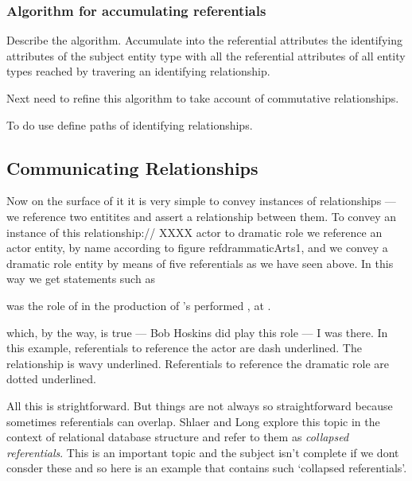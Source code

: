 \subsubsection{Algorithm for accumulating referentials}

Describe the algorithm.
Accumulate into the referential attributes the identifying attributes of the subject entity type
with all the referential attributes of all entity types reached by travering an identifying relationship.

Next need to refine this algorithm to take account of commutative relationships. 

To do use define paths of identifying relationships.

\subsection{Communicating Relationships}

\mynote 
Now on the surface of it it is very simple
to convey instances of relationships --- we reference two entitites and assert a relationship between them. 
To convey an instance of this relationship://
XXXX actor to dramatic role
we reference an actor entity, by name according to figure ref{drammaticArts1},
and we convey a dramatic role entity by means of five referentials as we have seen above.
In this way we get statements such as
\begin{erquote}

\parbox{9.0cm}{\linespread{1.5}\normalsize{} was  the role of  in the production of \mbox{'s}  performed \mbox{,} at .
}
\end{erquote}
which, by the way, is true  --- Bob Hoskins did play this role --- I was there.
In this example, referentials to reference the actor are dash underlined. The relationship is wavy underlined.
Referentials to reference the dramatic role are dotted underlined.

All this is strightforward. But things are not always so straightforward because sometimes referentials can overlap. 
Shlaer and Long explore this topic in the context of relational database structure and refer to them as \textit{collapsed referentials}. This is an important topic and the subject isn't complete if we dont 
consder these and so here is an example that contains such `collapsed referentials'.

